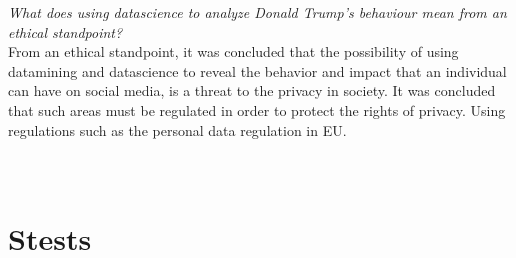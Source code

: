 \documentclass[11pt]{article}
\begin{document}
\textit{What does using datascience to analyze Donald Trump's behaviour mean from an ethical standpoint?}\\
 
From an ethical standpoint, it was concluded that the possibility of using datamining and datascience to reveal the behavior and impact that an individual can have on social media, is a threat to the privacy in society. It was concluded that such areas must be regulated in order to protect the rights of privacy. Using regulations such as the personal data regulation in EU.  


\citep{blizzcon}


\cleardoublepage





\cleardoublepage

\appendix
\section{\\Stests}
\end{document}
